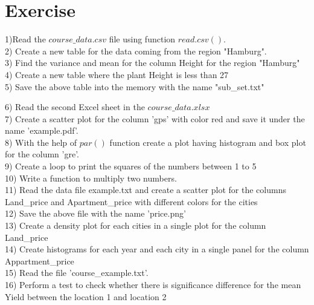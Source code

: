 \documentclass{article}
\begin{document}
\section*{Exercise}

1)Read the $course\_data.csv$ file using function $read.csv()$.\\

2) Create a new table for the data coming from the region "Hamburg".\\

3) Find the variance and mean for the column Height for the region "Hamburg"\\

4) Create a new table where the plant Height is less than 27\\

5) Save the above table into the memory with the name "sub\_set.txt"

6) Read the second Excel sheet in the $course\_data.xlsx$\\

7) Create a scatter plot for the column 'gps' with color red and save it under the name 'example.pdf'.\\

8) With the help of  $par()$ function create a plot having histogram and box plot for the column 'gre'.\\

9) Create a loop to print the squares of the numbers between 1 to 5\\

10) Write a function to multiply two numbers.\\

11) Read the data file example.txt and create a scatter plot for the columns Land\_price and Apartment\_price with different colors for the cities\\

12) Save the above file with the name 'price.png'\\

13) Create a density plot for each cities in a single plot for the column Land\_price\\

14) Create histograms for each year and each city in a single panel for the column Appartment\_price\\

15) Read the file 'course\_example.txt'.\\

16) Perform a test to check whether there is significance difference for the mean Yield between the location 1 and location 2\\
\end{document}
